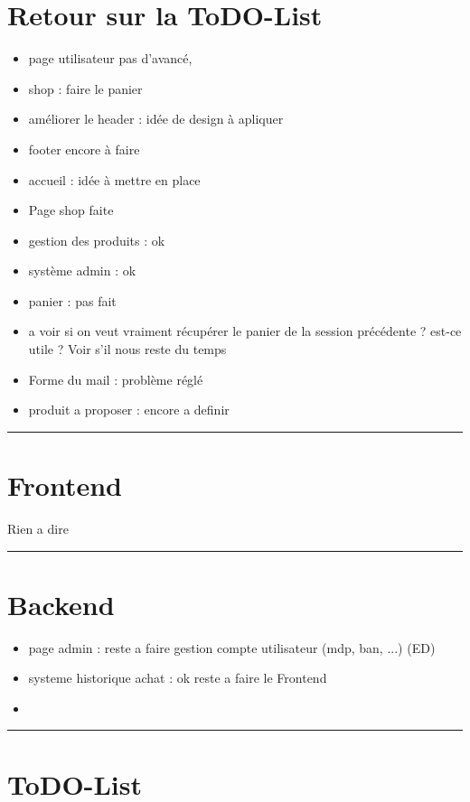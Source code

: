 \documentclass[10pt,a4paper]{report}
\begin{document}
\section{Retour sur la ToDO-List}
\begin{itemize}
        \item page utilisateur pas d'avancé, 
        \item shop : faire le panier
        \item améliorer le header : idée de design à apliquer
        \item footer encore à faire
        \item accueil : idée à mettre en place 
        \item Page shop faite
        \\
        \item gestion des produits : ok
        \item système admin : ok
        \item panier : pas fait
        \item a voir si on veut vraiment récupérer le panier de la session précédente ? est-ce utile ? Voir s'il nous reste du temps
        \item Forme du mail : problème réglé
        \\
        \item produit a proposer : encore a definir  
\end{itemize}



\noindent\rule{\linewidth}{0.5mm} \bigskip
\section{Frontend}
Rien a dire


\noindent\rule{\linewidth}{0.5mm} \bigskip
\section{Backend}

\begin{itemize}
        \item page admin : reste a faire gestion compte utilisateur (mdp, ban, ...) (ED)
        \item systeme historique achat : ok reste a faire le Frontend
        \item 
\end{itemize}


\noindent\rule{\linewidth}{0.5mm} \bigskip
\section{ToDO-List}
\end{document}
